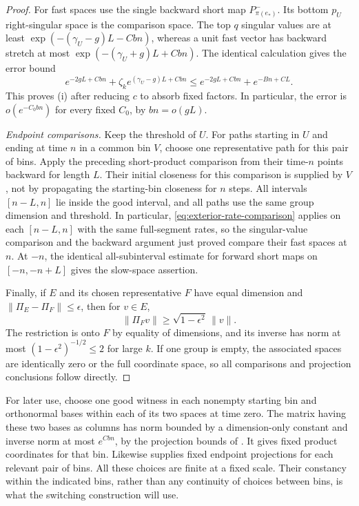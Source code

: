 \begin{proof}
For fast spaces use the single backward short map
$P_{\pi(e_*)}^-$.
Its bottom $p_U$ right-singular space is the comparison space.
The top $q$ singular values are at least
$\exp(-(\gamma_U-g)L-Cbn)$, whereas a unit fast vector has backward
stretch at most $\exp(-(\gamma_U+g)L+Cbn)$.
The identical calculation gives the error bound
\[
 e^{-2gL+Cbn}
       +\zeta_k e^{(\gamma_U-g)L+Cbn}
 \leq e^{-2gL+Cbn}+e^{-Bn+CL}.
\]
This proves \textup{(i)} after reducing $c$ to absorb fixed factors.
In particular, the error is $o(e^{-C_0bn})$ for every fixed $C_0$,
by $bn=o(gL)$.

\emph{Endpoint comparisons.}
Keep the threshold of $U$.
For paths starting in $U$ and ending at time $n$ in a common bin $V$,
choose one representative path for this pair of bins.
Apply the preceding short-product comparison from their time-$n$
points backward for length $L$.
Their initial closeness for this comparison is supplied by $V$,
not by propagating the starting-bin closeness for $n$ steps.
All intervals $[n-L,n]$ lie inside the good interval, and all paths
use the same group dimension and threshold.
In particular, \eqref{eq:exterior-rate-comparison} applies on each
$[n-L,n]$ with the same full-segment rates, so the singular-value
comparison and the backward argument just proved compare their fast
spaces at $n$. At $-n$, the identical all-subinterval estimate for
forward short maps on $[-n,-n+L]$ gives the slow-space assertion.

Finally, if $E$ and its chosen representative $F$ have equal dimension
and $\|\Pi_E-\Pi_F\|\leq\epsilon$, then for $v\in E$,
\[
 \|\Pi_F v\|\geq\sqrt{1-\epsilon^2}\,\|v\|.
\]
The restriction is onto $F$ by equality of dimensions, and its inverse
has norm at most $(1-\epsilon^2)^{-1/2}\leq2$ for large $k$.
If one group is empty, the associated spaces are identically zero or
the full coordinate space, so all comparisons and projection
conclusions follow directly.
\end{proof}

For later use, choose one good witness in each nonempty starting bin
and orthonormal bases within each of its two spaces at time zero.
The matrix having these two bases as columns has norm bounded by a
dimension-only constant and inverse norm at most $e^{Cbn}$, by the
projection bounds of .
It gives fixed product coordinates for that bin.
Likewise  supplies fixed endpoint projections
for each relevant pair of bins.
All these choices are finite at a fixed scale.  Their constancy within
the indicated bins, rather than any continuity of choices between
bins, is what the switching construction will use.

